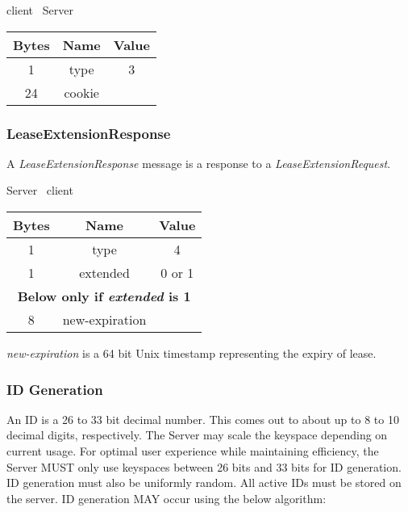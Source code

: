 \documentclass{article}
\begin{document}
    \begin{center}
        client \textrightarrow\ Server\\
        \begin{tabular}{|c|c|c|}
            \hline
            \textbf{Bytes} & \textbf{Name} & \textbf{Value} \\
            \hline
            1              & type          & 3              \\
            \hline
            24             & cookie        &                \\
            \hline
        \end{tabular}
    \end{center}

    \subsubsection{LeaseExtensionResponse}

    A \emph{LeaseExtensionResponse} message is a response to a \emph{LeaseExtensionRequest}.

    \begin{center}
        Server \textrightarrow\ client\\
        \begin{tabular}{|c|c|c|}
            \hline
            \textbf{Bytes} & \textbf{Name}  & \textbf{Value} \\
            \hline
            1              & type           & 4              \\
            \hline
            1              & extended       & 0 or 1         \\
            \hline
            \multicolumn{3}{|c|}{\textbf{Below only if \emph{extended} is 1} } \\
            \hline
            8              & new-expiration &                \\
            \hline
        \end{tabular}
    \end{center}

    \emph{new-expiration} is a 64 bit Unix timestamp representing the expiry of lease.

    \subsubsection{ID Generation}

    An ID is a 26 to 33 bit decimal number. This comes out to about up to 8 to 10 decimal digits, respectively. The
    Server may scale the keyspace depending on current usage. For optimal user experience while maintaining
    efficiency, the Server MUST only use keyspaces between 26 bits and 33 bits for ID generation. ID generation must
    also be uniformly random. All active IDs must be stored on the server. ID generation MAY occur using the below
    algorithm:\\
\end{document}

